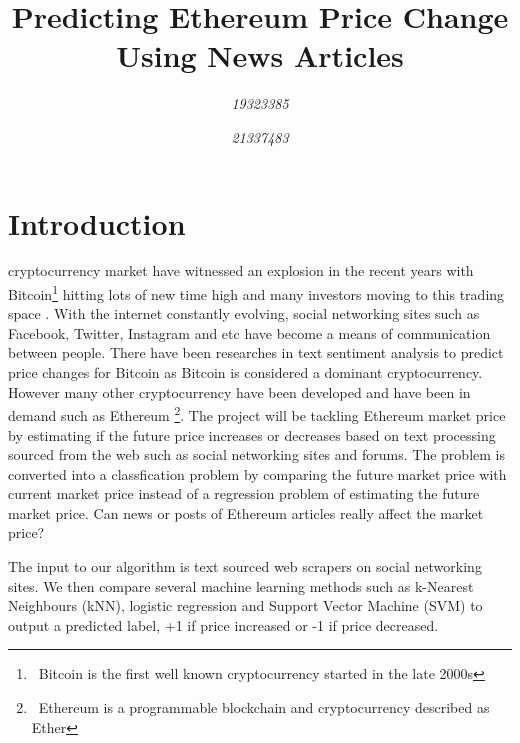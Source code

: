 \documentclass[transmag]{IEEEtran}
\begin{document}
\title{Predicting Ethereum Price Change Using News Articles}

\author{
\textit{19323385}
\and
{}
\textit{21337483}
\and
{}
}




\maketitle
\thispagestyle{plain}
\pagestyle{plain}


\section{Introduction}
 cryptocurrency market have witnessed an explosion in the recent years with Bitcoin\footnote{\ Bitcoin is the first well known cryptocurrency started in the late 2000s} hitting lots of new time high and many investors moving to this trading space \cite{huy2019predicting}. With the internet constantly evolving, social networking sites such as Facebook, Twitter, Instagram and etc have become a means of communication between people. There have been researches in text sentiment analysis to predict price changes for Bitcoin \cite{huy2019predicting}\cite{sattarov2020forecasting} as Bitcoin is considered a dominant cryptocurrency. However many other cryptocurrency have been developed and have been in demand such as Ethereum \footnote{\ Ethereum is a programmable blockchain and cryptocurrency described as Ether}. The project will be tackling Ethereum market price by estimating if the future price increases or decreases based on text processing sourced from the web such as social networking sites and forums. The problem is converted into a classfication problem by comparing the future market price with current market price instead of a regression problem of estimating the future market price. Can news or posts of Ethereum articles really affect the market price?

\noindent The input to our algorithm is text sourced web scrapers on social networking sites. We then compare several machine learning methods such as k-Nearest Neighbours (kNN), logistic regression and Support Vector Machine (SVM) to output a predicted label, +1 if price increased or -1 if price decreased.
\end{document}
